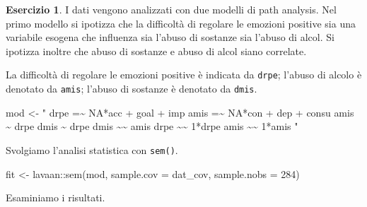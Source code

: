 \documentclass[
  11pt,
]{krantz}
\makeatletter
\newenvironment{Shaded}{\begin{snugshade}}{\end{snugshade}}
\newcommand{\AttributeTok}[1]{\textcolor[rgb]{0.61,0.61,0.61}{#1}}
\newcommand{\DecValTok}[1]{\textcolor[rgb]{0.06,0.06,0.06}{#1}}
\newcommand{\FunctionTok}[1]{\textcolor[rgb]{0,0,0}{#1}}
\newcommand{\NormalTok}[1]{#1}
\newcommand{\OtherTok}[1]{\textcolor[rgb]{0.37,0.37,0.37}{#1}}
\newcommand{\SpecialCharTok}[1]{\textcolor[rgb]{0,0,0}{#1}}
\newcommand{\StringTok}[1]{\textcolor[rgb]{0.5,0.5,0.5}{#1}}
\newenvironment{kframe}{%
\medskip{}
\setlength{\fboxsep}{.8em}
 \def\at@end@of@kframe{}%
 \ifinner\ifhmode%
  \def\at@end@of@kframe{\end{minipage}}%
  \begin{minipage}{\columnwidth}%
 \fi\fi%
 \def\FrameCommand##1{\hskip\@totalleftmargin \hskip-\fboxsep
 \colorbox{shadecolor}{##1}\hskip-\fboxsep
     \hskip-\linewidth \hskip-\@totalleftmargin \hskip\columnwidth}%
 \MakeFramed {\advance\hsize-\width
   \@totalleftmargin\z@ \linewidth\hsize
   \@setminipage}}%
 {\par\unskip\endMakeFramed%
 \at@end@of@kframe}
\renewenvironment{Shaded}{\begin{kframe}}{\end{kframe}}
\theoremstyle{definition}
\theoremstyle{definition}
\theoremstyle{definition}
\newtheorem{exercise}{Esercizio}[chapter]
\theoremstyle{definition}
\theoremstyle{remark}
\makeatother
\begin{document}
\begin{exercise}
I dati vengono analizzati con due modelli di path analysis. Nel primo modello si ipotizza che la difficoltà di regolare le emozioni positive sia una variabile esogena che influenza sia l'abuso di sostanze sia l'abuso di alcol. Si ipotizza inoltre che abuso di sostanze e abuso di alcol siano correlate.

La difficoltà di regolare le emozioni positive è indicata da \texttt{drpe}; l'abuso di alcolo è denotato da \texttt{amis}; l'abuso di sostanze è denotato da \texttt{dmis}.

\begin{Shaded}
\begin{Highlighting}[]
\NormalTok{mod }\OtherTok{\textless{}{-}} \StringTok{"}
\StringTok{  drpe =\textasciitilde{} NA*acc + goal + imp}
\StringTok{  amis =\textasciitilde{} NA*con + dep + consu}
\StringTok{  amis \textasciitilde{} drpe}
\StringTok{  dmis \textasciitilde{} drpe}
\StringTok{  dmis \textasciitilde{}\textasciitilde{} amis}
\StringTok{  drpe \textasciitilde{}\textasciitilde{} 1*drpe}
\StringTok{  amis \textasciitilde{}\textasciitilde{} 1*amis}
\StringTok{"}
\end{Highlighting}
\end{Shaded}

Svolgiamo l'analisi statistica con \texttt{sem()}.

\begin{Shaded}
\begin{Highlighting}[]
\NormalTok{fit }\OtherTok{\textless{}{-}}\NormalTok{ lavaan}\SpecialCharTok{::}\FunctionTok{sem}\NormalTok{(mod, }\AttributeTok{sample.cov =}\NormalTok{ dat\_cov, }\AttributeTok{sample.nobs =} \DecValTok{284}\NormalTok{)}
\end{Highlighting}
\end{Shaded}

Esaminiamo i risultati.


\end{exercise}
\end{document}
